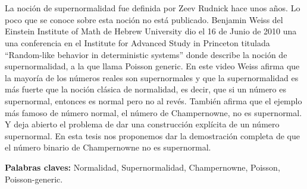 \chapter*{\runtitulo}


La noción de supernormalidad fue definida por Zeev Rudnick hace unos años. Lo poco que se conoce sobre esta noción no está publicado. Benjamin
Weiss del Einstein Institute of Math de Hebrew University dio el 16 de Junio de 2010 una una
conferencia en el Institute for Advanced Study in Princeton titulada “Random-like behavior
in deterministic systems” donde describe la noción de supernormalidad, a la que llama Poisson
generic. En este video Weiss afirma que la mayoría de los números reales son supernormales y que la supernormalidad es más fuerte que la noción clásica de normalidad, es decir, que si un número es supernormal, entonces es normal pero no al revés.
También afirma que el ejemplo más famoso de número normal, el número de Champernowne, no es supernormal. Y deja abierto
el problema de dar una construcción explícita de un número supernormal.
En esta tesis nos proponemos dar la demostración completa de que el número binario de
Champernowne no es supernormal.


\bigskip

\noindent\textbf{Palabras claves:} Normalidad, Supernormalidad, Champernowne, Poisson, Poisson-generic.